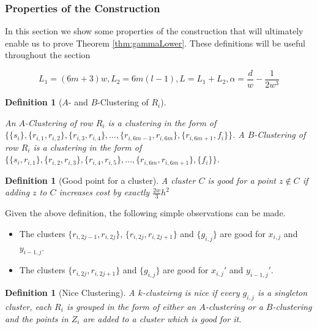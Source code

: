 \documentclass{article}
\newtheorem{definition}[theorem]{Definition}
\begin{document}
\subsubsection{Properties of the Construction}

In this section we show some properties of the construction that will ultimately enable us to prove Theorem \ref{thm:gammaLower}. These definitions will be useful throughout the section

$$L_1 = (6m+3)w, L_2 = 6m(l-1), L=L_1 + L_2, \alpha = \frac{d}{w}-\frac{1}{2w^3}$$

\begin{definition}[$A$- and $B$-Clustering of $R_i$]
\label{defn:abclusteringVattani}

An $A$-Clustering of row $R_i$ is a clustering in the form of $\{\{s_i\}, \{r_{i,1}, r_{i,2}\}, \{r_{i,3}, r_{i,4}\}, \ldots, \{r_{i,6m-1}, r_{i,6m}\},\{r_{i, 6m+1}, f_i\}\}$. A $B$-Clustering of row $R_i$ is a clustering in the form of $\{\{s_i, r_{i, 1}\}, \{r_{i,2}, r_{i,3}\}, \{r_{i,4}, r_{i,5}\}, \ldots, \{r_{i,6m}, r_{i,6m+1}\},\{f_i\}\}$. 
\end{definition}

\begin{definition}[Good point for a cluster]
\label{defn:goodPointVattani}
A cluster $C$ is good for a point $z \not\in C$ if adding $z$ to $C$ increases cost by exactly $\frac{2w}{3}h^2$ 
\end{definition}

Given the above definition, the following simple observations can be made. 
\begin{itemize}[nolistsep,noitemsep]
\item The clusters $\{r_{i,2j-1}, r_{i, 2j}\}$, $\{r_{i,2j}, r_{i, 2j+1}\}$ and $\{g_{i,j}\}$ are good for $x_{i,j}$ and $y_{i-1,j}$.
\item The clusters $\{r_{i,2j}, r_{i, 2j+1}\}$ and $\{g_{i,j}\}$ are good for $x_{i,j}'$ and $y_{i-1,j}'$.
\end{itemize}

\begin{definition}[Nice Clustering]
\label{defn:niceClustering}
A $k$-clusteirng is nice if every $g_{i,j}$ is a singleton cluster, each $R_i$ is grouped in the form of either an $A$-clustering or a $B$-clustering and the points in $Z_i$ are added to a cluster which is good for it.
\end{definition}
\end{document}
